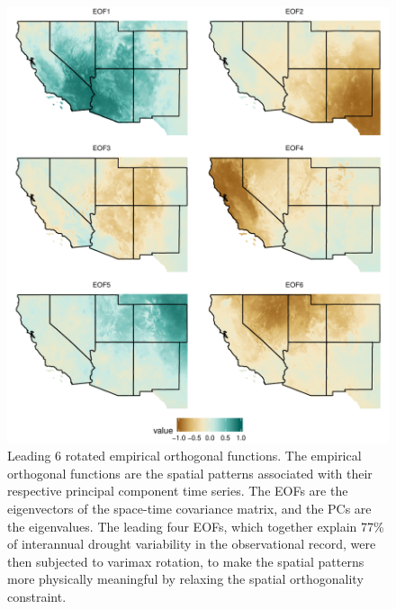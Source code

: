 \documentclass[fleqn,10pt]{wlscirep}
\begin{document}
\begin{figure}[!htbp]
\centering
\includegraphics[width=.8\linewidth]{figures/reof_observed.pdf}
\caption{Leading 6 rotated empirical orthogonal functions. The empirical orthogonal functions are the spatial patterns associated with their respective principal component time series. The EOFs are the eigenvectors of the space-time covariance matrix, and the PCs are the eigenvalues. The leading four EOFs, which together explain 77\% of interannual drought variability in the observational record, were then subjected to varimax rotation, to make the spatial patterns more physically meaningful by relaxing the spatial orthogonality constraint.}
\label{fig:reofs}
\end{figure}
\end{document}
